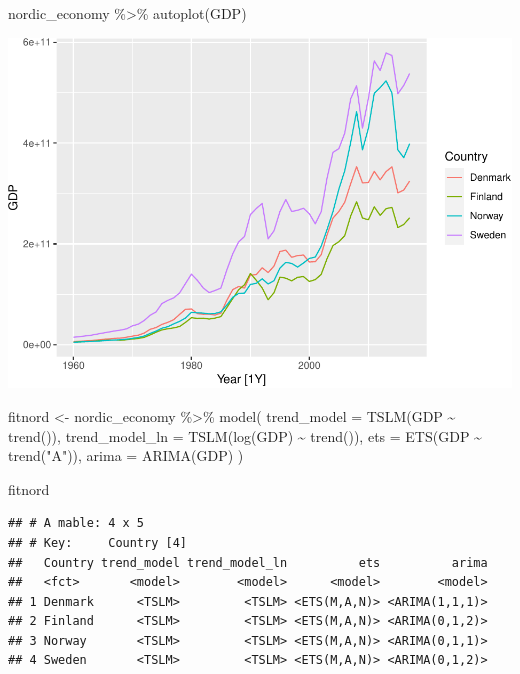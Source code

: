 \documentclass[
]{book}
\newenvironment{Shaded}{\begin{snugshade}}{\end{snugshade}}
\newcommand{\AttributeTok}[1]{\textcolor[rgb]{0.77,0.63,0.00}{#1}}
\newcommand{\FunctionTok}[1]{\textcolor[rgb]{0.00,0.00,0.00}{#1}}
\newcommand{\NormalTok}[1]{#1}
\newcommand{\OtherTok}[1]{\textcolor[rgb]{0.56,0.35,0.01}{#1}}
\newcommand{\SpecialCharTok}[1]{\textcolor[rgb]{0.00,0.00,0.00}{#1}}
\newcommand{\StringTok}[1]{\textcolor[rgb]{0.31,0.60,0.02}{#1}}
\begin{document}
\begin{Shaded}
\begin{Highlighting}[]
\NormalTok{nordic\_economy }\SpecialCharTok{\%\textgreater{}\%} \FunctionTok{autoplot}\NormalTok{(GDP)}
\end{Highlighting}
\end{Shaded}

\includegraphics{graphics/unnamed-chunk-40-1.pdf}

\begin{Shaded}
\begin{Highlighting}[]
\NormalTok{fitnord }\OtherTok{\textless{}{-}}\NormalTok{ nordic\_economy }\SpecialCharTok{\%\textgreater{}\%}
  \FunctionTok{model}\NormalTok{(}
    \AttributeTok{trend\_model =} \FunctionTok{TSLM}\NormalTok{(GDP }\SpecialCharTok{\textasciitilde{}} \FunctionTok{trend}\NormalTok{()),}
    \AttributeTok{trend\_model\_ln =} \FunctionTok{TSLM}\NormalTok{(}\FunctionTok{log}\NormalTok{(GDP) }\SpecialCharTok{\textasciitilde{}} \FunctionTok{trend}\NormalTok{()),}
    \AttributeTok{ets =} \FunctionTok{ETS}\NormalTok{(GDP }\SpecialCharTok{\textasciitilde{}} \FunctionTok{trend}\NormalTok{(}\StringTok{"A"}\NormalTok{)),}
    \AttributeTok{arima =} \FunctionTok{ARIMA}\NormalTok{(GDP)}
\NormalTok{  )}

\NormalTok{fitnord}
\end{Highlighting}
\end{Shaded}

\begin{verbatim}
## # A mable: 4 x 5
## # Key:     Country [4]
##   Country trend_model trend_model_ln          ets          arima
##   <fct>       <model>        <model>      <model>        <model>
## 1 Denmark      <TSLM>         <TSLM> <ETS(M,A,N)> <ARIMA(1,1,1)>
## 2 Finland      <TSLM>         <TSLM> <ETS(M,A,N)> <ARIMA(0,1,2)>
## 3 Norway       <TSLM>         <TSLM> <ETS(M,A,N)> <ARIMA(0,1,1)>
## 4 Sweden       <TSLM>         <TSLM> <ETS(M,A,N)> <ARIMA(0,1,2)>
\end{verbatim}
\end{document}

